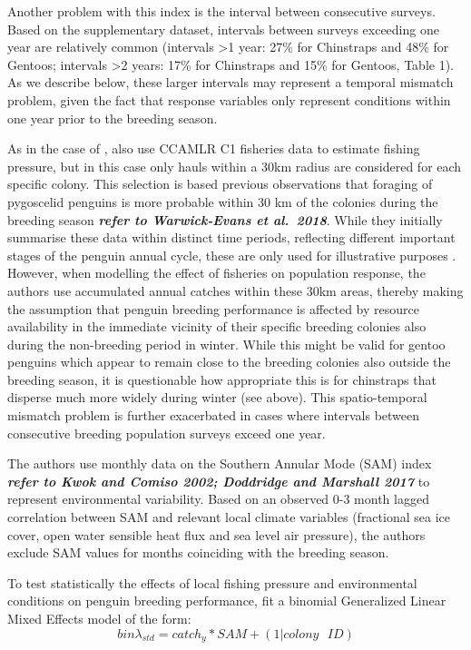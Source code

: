 \documentclass[]{elsarticle} %
\begin{document}
Another problem with this index is the interval between consecutive
surveys. Based on the \citet{Kruger2021} supplementary dataset,
intervals between surveys exceeding one year are relatively common
(intervals \textgreater1 year: 27\% for Chinstraps and 48\% for Gentoos;
intervals \textgreater2 years: 17\% for Chinstraps and 15\% for Gentoos,
Table 1). As we describe below, these larger intervals may represent a
temporal mismatch problem, given the fact that response variables only
represent conditions within one year prior to the breeding season.

As in the case of \citet{Watters2020}, \citet{Kruger2021} also use
CCAMLR C1 fisheries data to estimate fishing pressure, but in this case
only hauls within a 30km radius are considered for each specific colony.
This selection is based previous observations that foraging of
pygoscelid penguins is more probable within 30 km of the colonies during
the breeding season \textbf{\emph{refer to Warwick-Evans et al.~2018}}.
While they initially summarise these data within distinct time periods,
reflecting different important stages of the penguin annual cycle, these
are only used for illustrative purposes \citep[Fig 3 in][]{Kruger2021}.
However, when modelling the effect of fisheries on population response,
the authors use accumulated annual catches within these 30km areas,
thereby making the assumption that penguin breeding performance is
affected by resource availability in the immediate vicinity of their
specific breeding colonies also during the non-breeding period in
winter. While this might be valid for gentoo penguins which appear to
remain close to the breeding colonies also outside the breeding season,
it is questionable how appropriate this is for chinstraps that disperse
much more widely during winter (see above). This spatio-temporal
mismatch problem is further exacerbated in cases where intervals between
consecutive breeding population surveys exceed one year.

The authors use monthly data on the Southern Annular Mode (SAM) index
\textbf{\emph{refer to Kwok and Comiso 2002; Doddridge and Marshall
2017}} to represent environmental variability. Based on an observed 0-3
month lagged correlation between SAM and relevant local climate
variables (fractional sea ice cover, open water sensible heat flux and
sea level air pressure), the authors exclude SAM values for months
coinciding with the breeding season.

To test statistically the effects of local fishing pressure and
environmental conditions on penguin breeding performance,
\citet{Kruger2021} fit a binomial Generalized Linear Mixed Effects model
of the form: \[bin\lambda_{std}=catch_y*SAM+(1|colony\text{ }ID)\]
\end{document}
